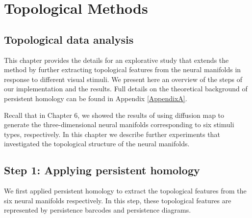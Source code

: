 \chapter{Topological Methods}
\label{chapter-topology} 

\section{Topological data analysis}
This chapter provides the details for an explorative study that extends the method by further extracting topological features from the neural manifolds in response to different visual stimuli. We present here an overview of the steps of our implementation and the results. Full details on the theoretical background of persistent homology can be found in Appendix \ref{AppendixA}. 

Recall that in Chapter 6, we showed the results of using diffusion map to generate the three-dimensional neural manifolds corresponding to six stimuli types, respectively. In this chapter we describe further experiments that investigated the topological structure of the neural manifolds.


\section{Step 1: Applying persistent homology}
We first applied persistent homology to extract the topological features from  the six neural manifolds respectively. In this step, these topological features are represented by persistence barcodes and persistence diagrams.


